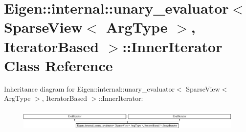 \hypertarget{class_eigen_1_1internal_1_1unary__evaluator_3_01_sparse_view_3_01_arg_type_01_4_00_01_iterator_based_01_4_1_1_inner_iterator}{}\section{Eigen\+:\+:internal\+:\+:unary\+\_\+evaluator$<$ Sparse\+View$<$ Arg\+Type $>$, Iterator\+Based $>$\+:\+:Inner\+Iterator Class Reference}
\label{class_eigen_1_1internal_1_1unary__evaluator_3_01_sparse_view_3_01_arg_type_01_4_00_01_iterator_based_01_4_1_1_inner_iterator}
Inheritance diagram for Eigen\+:\+:internal\+:\+:unary\+\_\+evaluator$<$ Sparse\+View$<$ Arg\+Type $>$, Iterator\+Based $>$\+:\+:Inner\+Iterator\+:\begin{figure}[H]
\begin{center}
\leavevmode
\includegraphics[height=1.070746cm]{class_eigen_1_1internal_1_1unary__evaluator_3_01_sparse_view_3_01_arg_type_01_4_00_01_iterator_based_01_4_1_1_inner_iterator}
\end{center}
\end{figure}
